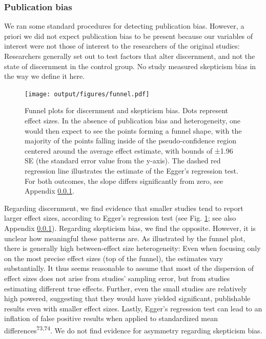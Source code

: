 \documentclass[
  doc,floatsintext]{apa6}
\begin{document}
\subsubsection{Publication bias}\label{publication-bias}

We ran some standard procedures for detecting publication bias. However, a priori we did not expect publication bias to be present because our variables of interest were not those of interest to the researchers of the original studies: Researchers generally set out to test factors that alter discernment, and not the state of discernment in the control group. No study measured skepticism bias in the way we define it here.



\begin{figure}
\centering
\texttt{[image: output/figures/funnel.pdf]}
\caption{\label{fig:funnel}Funnel plots for discernment and skepticism bias. Dots represent effect sizes. In the absence of publication bias and heterogeneity, one would then expect to see the points forming a funnel shape, with the majority of the points falling inside of the pseudo-confidence region centered around the average effect estimate, with bounds of ±1.96 SE (the standard error value from the y-axis). The dashed red regression line illustrates the estimate of the Egger's regression test. For both outcomes, the slope differs significantly from zero, see Appendix \ref{publication-bias}.}
\end{figure}

Regarding discernment, we find evidence that smaller studies tend to report larger effect sizes, according to Egger's regression test (see Fig. \ref{fig:funnel}; see also Appendix \ref{publication-bias}). Regarding skepticism bias, we find the opposite. However, it is unclear how meaningful these patterns are. As illustrated by the funnel plot, there is generally high between-effect size heterogeneity: Even when focusing only on the most precise effect sizes (top of the funnel), the estimates vary substantially. It thus seems reasonable to assume that most of the dispersion of effect sizes does not arise from studies' sampling error, but from studies estimating different true effects. Further, even the small studies are relatively high powered, suggesting that they would have yielded significant, publishable results even with smaller effect sizes. Lastly, Egger's regression test can lead to an inflation of false positive results when applied to standardized mean differences\textsuperscript{73,74}. We do not find evidence for asymmetry regarding skepticism bias.
\end{document}
